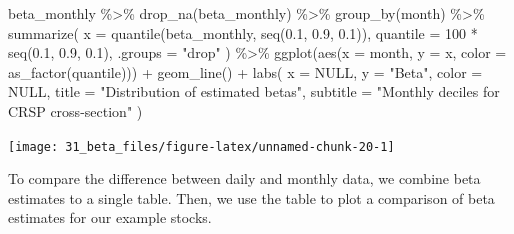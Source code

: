\documentclass[
]{krantz}
\newenvironment{Shaded}{\begin{snugshade}}{\end{snugshade}}
\newcommand{\AttributeTok}[1]{\textcolor[rgb]{0.61,0.61,0.61}{#1}}
\newcommand{\ConstantTok}[1]{\textcolor[rgb]{0,0,0}{#1}}
\newcommand{\DecValTok}[1]{\textcolor[rgb]{0.06,0.06,0.06}{#1}}
\newcommand{\FloatTok}[1]{\textcolor[rgb]{0.06,0.06,0.06}{#1}}
\newcommand{\FunctionTok}[1]{\textcolor[rgb]{0,0,0}{#1}}
\newcommand{\NormalTok}[1]{#1}
\newcommand{\SpecialCharTok}[1]{\textcolor[rgb]{0,0,0}{#1}}
\newcommand{\StringTok}[1]{\textcolor[rgb]{0.5,0.5,0.5}{#1}}
\begin{document}
\begin{Shaded}
\begin{Highlighting}[]
\NormalTok{beta\_monthly }\SpecialCharTok{\%\textgreater{}\%}
  \FunctionTok{drop\_na}\NormalTok{(beta\_monthly) }\SpecialCharTok{\%\textgreater{}\%}
  \FunctionTok{group\_by}\NormalTok{(month) }\SpecialCharTok{\%\textgreater{}\%}
  \FunctionTok{summarize}\NormalTok{(}
    \AttributeTok{x =} \FunctionTok{quantile}\NormalTok{(beta\_monthly, }\FunctionTok{seq}\NormalTok{(}\FloatTok{0.1}\NormalTok{, }\FloatTok{0.9}\NormalTok{, }\FloatTok{0.1}\NormalTok{)),}
    \AttributeTok{quantile =} \DecValTok{100} \SpecialCharTok{*} \FunctionTok{seq}\NormalTok{(}\FloatTok{0.1}\NormalTok{, }\FloatTok{0.9}\NormalTok{, }\FloatTok{0.1}\NormalTok{),}
    \AttributeTok{.groups =} \StringTok{"drop"}
\NormalTok{  ) }\SpecialCharTok{\%\textgreater{}\%}
  \FunctionTok{ggplot}\NormalTok{(}\FunctionTok{aes}\NormalTok{(}\AttributeTok{x =}\NormalTok{ month, }\AttributeTok{y =}\NormalTok{ x, }\AttributeTok{color =} \FunctionTok{as\_factor}\NormalTok{(quantile))) }\SpecialCharTok{+}
  \FunctionTok{geom\_line}\NormalTok{() }\SpecialCharTok{+}
  \FunctionTok{labs}\NormalTok{(}
    \AttributeTok{x =} \ConstantTok{NULL}\NormalTok{, }\AttributeTok{y =} \StringTok{"Beta"}\NormalTok{, }\AttributeTok{color =} \ConstantTok{NULL}\NormalTok{,}
    \AttributeTok{title =} \StringTok{"Distribution of estimated betas"}\NormalTok{,}
    \AttributeTok{subtitle =} \StringTok{"Monthly deciles for CRSP cross{-}section"}
\NormalTok{  )}
\end{Highlighting}
\end{Shaded}

\begin{center}\texttt{[image: 31\_beta\_files/figure-latex/unnamed-chunk-20-1]} \end{center}

To compare the difference between daily and monthly data, we combine beta estimates to a single table. Then, we use the table to plot a comparison of beta estimates for our example stocks.
\end{document}
